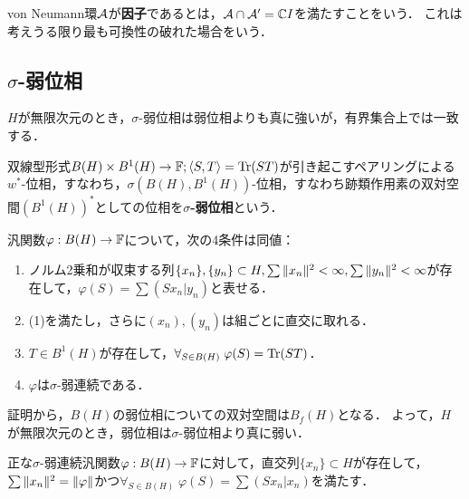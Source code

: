 \documentclass[uplatex,dvipdfmx]{jsreport}
\begin{document}
\begin{definition}[factor]
    von Neumann環$\mathcal{A}$が\textbf{因子}であるとは，$\mathcal{A}\cap\mathcal{A}'=\mathbb{C} I$を満たすことをいう．
    これは考えうる限り最も可換性の破れた場合をいう．
\end{definition}

\subsection{$\sigma$-弱位相}

\begin{tcolorbox}[colframe=ForestGreen, colback=ForestGreen!10!white,breakable,colbacktitle=ForestGreen!40!white,coltitle=black,fonttitle=\bfseries\sffamily,
title=]
    $H$が無限次元のとき，$\sigma$-弱位相は弱位相よりも真に強いが，有界集合上では一致する．
\end{tcolorbox}

\begin{definition}
    双線型形式$B(H)\times B^1(H)\to\mathbb{F};\langle S,T\rangle=\mathrm{Tr}(ST)$が引き起こすペアリングによる$w^*$-位相，すなわち，$\sigma(B(H),B^1(H))$-位相，すなわち跡類作用素の双対空間$(B^1(H))^*$としての位相を\textbf{$\sigma$-弱位相}という．
\end{definition}

\begin{proposition}
    汎関数$\varphi:B(H)\to\mathbb{F}$について，次の4条件は同値：
    \begin{enumerate}
        \item ノルム2乗和が収束する列$\{x_n\},\{y_n\}\subset H,\sum\|x_n\|^2<\infty,\sum\|y_n\|^2<\infty$が存在して，$\varphi(S)=\sum(Sx_n|y_n)$と表せる．
        \item (1)を満たし，さらに$(x_n),(y_n)$は組ごとに直交に取れる．
        \item $T\in B^1(H)$が存在して，$\forall_{S\in B(H)}\;\varphi(S)=\mathrm{Tr}(ST)$．
        \item $\varphi$は$\sigma$-弱連続である．
    \end{enumerate}
\end{proposition}
\begin{remark}
    証明から，$B(H)$の弱位相についての双対空間は$B_f(H)$となる．
    よって，$H$が無限次元のとき，弱位相は$\sigma$-弱位相より真に弱い．
\end{remark}

\begin{corollary}
    正な$\sigma$-弱連続汎関数$\varphi:B(H)\to\mathbb{F}$に対して，直交列$\{x_n\}\subset H$が存在して，$\sum\|x_n\|^2=\|\varphi\|$かつ$\forall_{S\in B(H)}\;\varphi(S)=\sum(Sx_n|x_n)$を満たす．
\end{corollary}
\end{document}

